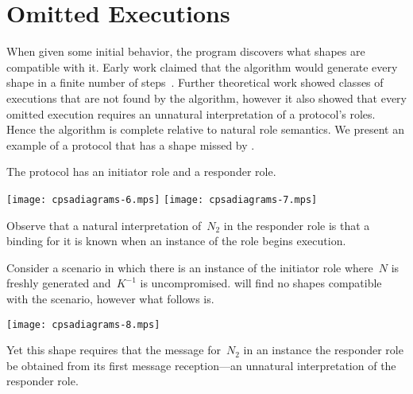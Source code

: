 \documentclass[12pt]{article}
\begin{document}


\section{Omitted Executions}\label{sec:omitted executions}

When given some initial behavior, the {\cpsa} program discovers what
shapes are compatible with it.  Early work claimed that the {\cpsa}
algorithm would generate every shape in a finite number of
steps~\cite{DoghmiGuttmanThayer07,Guttman11}.  Further theoretical
work showed classes of executions that are not found by the algorithm,
however it also showed that every omitted execution requires an
unnatural interpretation of a protocol's roles.  Hence the algorithm
is complete relative to natural role semantics.  We present an example
of a protocol that has a shape missed by {\cpsa}.

The protocol has an initiator role and a responder role.
\begin{center}
\texttt{[image: cpsadiagrams-6.mps]}\hfil
\texttt{[image: cpsadiagrams-7.mps]}
\end{center}

Observe that a natural interpretation of~$N_2$ in the responder role
is that a binding for it is known when an instance of the role begins
execution.

Consider a scenario in which there is an instance of the initiator
role where~$N$ is freshly generated and~$K^{-1}$ is uncompromised.
{\cpsa} will find no shapes compatible with the scenario, however what
follows is.
\begin{center}
\texttt{[image: cpsadiagrams-8.mps]}
\end{center}
Yet this shape requires that the message for~$N_2$ in an instance the
responder role be obtained from its first message reception---an
unnatural interpretation of the responder role.




\printindex
\end{document}
